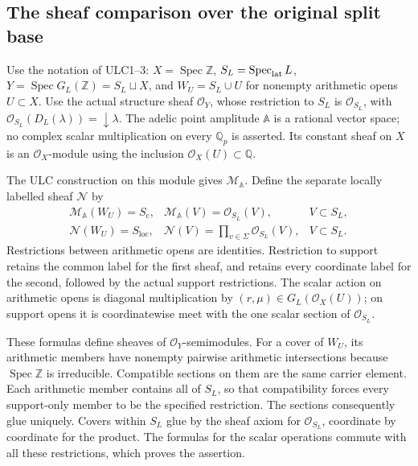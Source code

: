 \subsection{The sheaf comparison over the original split base}

Use the notation of ULC1--3:
$X=\operatorname{Spec}\mathbb Z$, $S_L=\operatorname{Spec}_{\rm lat}L$,
$Y=\operatorname{Spec}G_L(\mathbb Z)=S_L\sqcup X$,
and $W_U=S_L\cup U$ for nonempty arithmetic opens $U\subset X$.
Use the actual structure sheaf $\mathcal O_Y$, whose restriction
to $S_L$ is $\mathcal O_{S_L}$, with
$\mathcal O_{S_L}(D_L(\lambda))=\downarrow\lambda$.
The adelic point amplitude $\mathbb A$ is a rational vector space;
no complex scalar multiplication on every $\mathbb Q_p$ is asserted.
Its constant sheaf on $X$ is an $\mathcal O_X$-module using the
inclusion $\mathcal O_X(U)\subset\mathbb Q$.

The ULC construction on this module gives $\mathcal M_{\mathbb A}$.
Define the separate locally labelled sheaf $\mathcal N$ by
\begin{equation}\tag{PLP11}
\begin{array}{lll}
\mathcal M_{\mathbb A}(W_U)=S_{\mathrm c},&
\mathcal M_{\mathbb A}(V)=\mathcal O_{S_L}(V),& V\subset S_L,\\
\mathcal N(W_U)=S_{\mathrm{loc}},&
\mathcal N(V)=\displaystyle\prod_{v\in\Sigma}\mathcal O_{S_L}(V),
& V\subset S_L.
\end{array}
\end{equation}
Restrictions between arithmetic opens are identities.
Restriction to support retains the common label for the first sheaf,
and retains every coordinate label for the second, followed by the
actual support restrictions. The scalar action on arithmetic opens
is diagonal multiplication by $(r,\mu)\in
G_L(\mathcal O_X(U))$; on support opens it is coordinatewise meet
with the one scalar section of $\mathcal O_{S_L}$.

These formulas define sheaves of $\mathcal O_Y$-semimodules.
For a cover of $W_U$, its arithmetic members have nonempty pairwise
arithmetic intersections because $\operatorname{Spec}\mathbb Z$
is irreducible. Compatible sections on them are the same carrier
element. Each arithmetic member contains all of $S_L$, so that
compatibility forces every support-only member to be the specified
restriction. The sections consequently glue uniquely. Covers within
$S_L$ glue by the sheaf axiom for $\mathcal O_{S_L}$, coordinate
by coordinate for the product. The formulas for the scalar operations
commute with all these restrictions, which proves the assertion.

